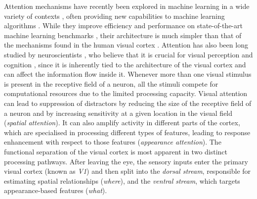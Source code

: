     
    Attention mechanisms have recently been explored in machine learning in a wide variety of contexts \cite{Vinyals2014, Jaderberg2015}, often providing new capabilities to machine learning algorithms \cite{Graves2016,Wierstra2015draw, Eslami2016}. While they improve efficiency \cite{Graves2014recurrent} and performance on state-of-the-art machine learning benchmarks \cite{Vinyals2014}, their architecture is much simpler than that of the mechanisms found in the human visual cortex \cite{Dayan2001}. Attention has also been long studied by neuroscientists \cite{Ungerleider2000}, who believe that it is crucial for visual perception and cognition \cite{Olshausen2016foveal}, since it is inherently tied to the architecture of the visual cortex and can affect the information flow inside it. Whenever more than one visual stimulus is present in the receptive field of a neuron, all the stimuli compete for computational resources due to the limited processing capacity. 
	Visual attention can lead to suppression of distractors by reducing the size of the receptive field of a neuron and by increasing sensitivity at a given location in the visual field (\emph{spatial attention}). It can also amplify activity in different parts of the cortex, which are
	specialised in processing different types of features, leading to  response enhancement with respect to those features (\emph{appearance attention}).
	The functional separation of the visual cortex is most apparent in two distinct processing pathways. After leaving the eye, the sensory inputs enter the primary visual cortex (known as \emph{V1}) and then split into the \emph{dorsal stream}, responsible for estimating spatial relationships (\emph{where}), and the \emph{ventral stream}, which targets appearance-based features (\emph{what}).

